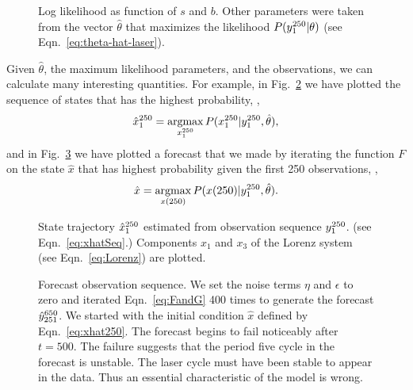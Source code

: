 \begin{figure}[htbp]
  \caption[Log likelihood as function of $s$ and $b$.]%
  {Log likelihood as function of $s$ and $b$.  Other parameters were
    taken from the vector $\hat \theta$ that maximizes the likelihood
    $P(y_{1}^{250}|\theta)$ (see Eqn.~\eqref{eq:theta-hat-laser}).}
  \label{fig:LaserLogLike}
\end{figure}

Given $\hat \theta$, the maximum likelihood parameters, and the
observations, we can calculate many interesting quantities.  For
example, in Fig.~\ref{fig:LaserStates} we have plotted the sequence of
states that has the highest probability, \ie,
\begin{equation}
  \label{eq:xhatSeq}
  \hat x_{1}^{250} = \operatorname*{argmax}_{x_{1}^{250}}
  P(x_{1}^{250}|y_{1}^{250},\hat \theta),
\end{equation}
and in Fig.~\ref{fig:LaserForecast} we have plotted a forecast that we
made by iterating the function $F$ on the state $\hat x$ that has
highest probability given the first 250 observations, \ie,
\begin{equation}
  \label{eq:xhat250}
  \hat x = \operatorname*{argmax}_{{x}{(250)}} P({x}{(250)}|y_{1}^{250},\hat \theta).
\end{equation}

\begin{figure}[htbp]
  \centering{\plotsize%
    }
  \caption[State trajectory $\ts{\hat x}{1}{250}$.]%
  {State trajectory $\ts{\hat x}{1}{250}$ estimated from
    observation sequence $y_{1}^{250}$. (see
    Eqn.~\eqref{eq:xhatSeq}.)  Components $x_1$ and $x_3$ of the
    Lorenz system (see Eqn.~\eqref{eq:Lorenz}) are plotted.}
  \label{fig:LaserStates}
\end{figure}

\begin{figure}[htbp]
  \caption[Forecast observation sequence.]%
  {Forecast observation sequence.  We set the noise terms $\eta$ and
    $\epsilon$ to zero and iterated Eqn.~\eqref{eq:FandG} 400 times to
    generate the forecast $\hat y_{251}^{650}$.  We started with
    the initial condition $\hat x$ defined by Eqn.~\eqref{eq:xhat250}.
    The forecast begins to fail noticeably after $t=500$.  The failure
    suggests that the period five cycle in the forecast is unstable.
    The laser cycle must have been stable to appear in the data.  Thus
    an essential characteristic of the model is wrong.}
  \label{fig:LaserForecast}
\end{figure}



